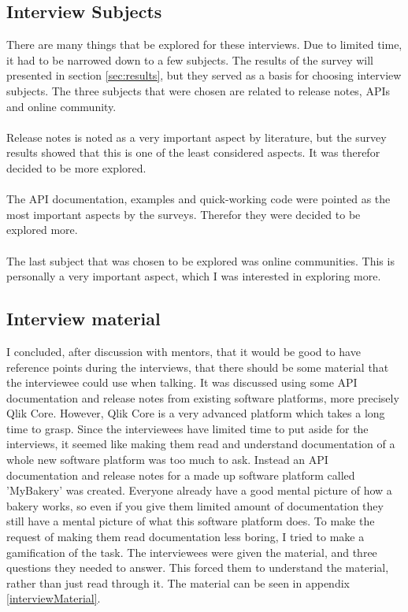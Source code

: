 \documentclass{cslthse-msc}
\begin{document}
    \subsection{Interview Subjects}
    There are many things that be explored for these interviews. Due to limited
    time, it had to be narrowed down to a few subjects. The results of the survey will presented in section \ref{sec:results}, but they served as a basis for choosing interview subjects. The three subjects that were chosen are related to release notes, APIs and online community.
    \\ \\
    Release notes is noted as a very important aspect by literature, but
    the survey results showed that this is one of the least considered aspects. It was therefor decided to be more explored.
    \\ \\
    The API documentation, examples and quick-working code were pointed as the most important aspects by the
    surveys. Therefor they were decided to be explored more.
    \\ \\
    The last subject that was chosen to be explored was online communities. This is personally a very important aspect, which I was interested in exploring more.

    \subsection{Interview material}
    I concluded, after discussion with mentors, that it would be good to have reference points during the interviews,
    that there should be some material that the interviewee could use when talking.
    It was discussed using some API documentation and release notes from existing software platforms,
    more precisely Qlik Core. However, Qlik Core is a very advanced platform which takes a long time
    to grasp. Since the interviewees have limited time to put aside for the interviews, it seemed
    like making them read and understand documentation of a whole new software platform was too much to ask.
    Instead an API documentation and release notes for a made up software platform
    called 'MyBakery' was created. Everyone already have a good mental picture of how a bakery works,
    so even if you give them limited amount of documentation they still have a mental picture
    of what this software platform does. To make the request of making them read documentation less boring,
    I tried to make a gamification of the task. The interviewees were given the material, and
    three questions they needed to answer. This forced them to understand the material, rather
    than just read through it. The material can be seen in appendix \ref{interviewMaterial}.
\end{document}
